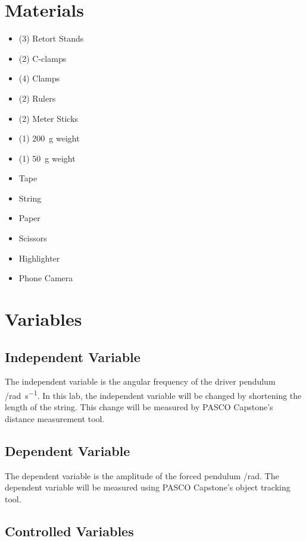 \documentclass[letterpaper, 12pt]{article}
\begin{document}
\section{Materials}

\begin{multicols}{2}
    \begin{itemize}
        \item (3) Retort Stands
        \item (2) C-clamps
        \item (4) Clamps
        \item (2) Rulers
        \item (2) Meter Sticks
        \item (1) \SI{200}{g} weight
        \item (1) \SI{50}{g} weight
        \item Tape
        \item String
        \item Paper
        \item Scissors
        \item Highlighter
        \item Phone Camera
    \end{itemize}
\end{multicols}

\section{Variables}

\subsection{Independent Variable}
The independent variable is the angular frequency of the driver pendulum
/\unit{rad.s^{-1}}. In this lab, the independent variable will be changed
by shortening the length of the string. This change will be measured by
PASCO Capstone's distance measurement tool.

\subsection{Dependent Variable}
The dependent variable is the amplitude of the forced pendulum /\unit{rad}.
The dependent variable will be measured using PASCO Capstone's
object tracking tool.

\subsection{Controlled Variables}
\end{document}
